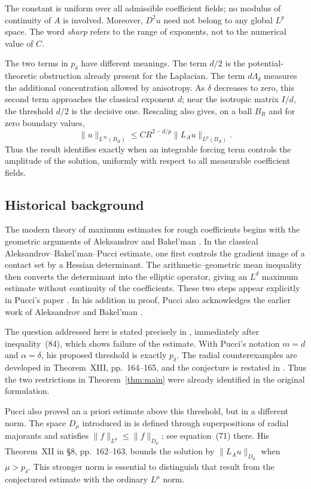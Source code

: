 \documentclass[11pt,a4paper,reqno]{amsart}
\theoremstyle{plain}
\theoremstyle{remark}
\numberwithin{equation}{section}
\newcommand{\lam}{\Lambda_\delta}
\newcommand{\pcrit}{p_\delta}
\newcommand{\norm}[1]{\lVert#1\rVert}
\begin{document}
The constant is uniform over all admissible coefficient fields; no modulus of continuity of $A$ is involved. Moreover, $D^2u$ need not belong to any global $L^p$ space. The word \emph{sharp} refers to the range of exponents, not to the numerical value of $C$.

The two terms in $\pcrit$ have different meanings. The term $d/2$ is the potential-theoretic obstruction already present for the Laplacian. The term $d\lam$ measures the additional concentration allowed by anisotropy. As $\delta$ decreases to zero, this second term approaches the classical exponent $d$; near the isotropic matrix $I/d$, the threshold $d/2$ is the decisive one. Rescaling also gives, on a ball $B_R$ and for zero boundary values,
\[
 \norm{u}_{L^\infty(B_R)}
 \le C R^{2-d/p}\norm{L_Au}_{L^p(B_R)}.
\]
Thus the result identifies exactly when an integrable forcing term controls the amplitude of the solution, uniformly with respect to all measurable coefficient fields.

\subsection{Historical background}
The modern theory of maximum estimates for rough coefficients begins with the geometric arguments of Aleksandrov and Bakel'man \cite{Aleksandrov1960,Bakelman1961}. In the classical Aleksandrov--Bakel'man--Pucci estimate, one first controls the gradient image of a contact set by a Hessian determinant. The arithmetic--geometric mean inequality then converts the determinant into the elliptic operator, giving an $L^d$ maximum estimate without continuity of the coefficients. These two steps appear explicitly in Pucci's paper \cite[\S1, Propositions~V--VI, pp.~18--19; \S2, Lemma and Theorem~I, pp.~20--21]{PucciBounds1966}. In his addition in proof, Pucci also acknowledges the earlier work of Aleksandrov and Bakel'man \cite[p.~30]{PucciBounds1966}.

The question addressed here is stated precisely in \cite[\S9, Observation~II, p.~166]{PucciExtremal1966}, immediately after inequality~(84), which shows failure of the estimate. With Pucci's notation $m=d$ and $\alpha=\delta$, his proposed threshold is exactly $\pcrit$. The radial counterexamples are developed in Theorem~XIII, pp.~164--165, and the conjecture is restated in \cite[\S4(a), p.~27]{PucciBounds1966}. Thus the two restrictions in Theorem~\ref{thm:main} were already identified in the original formulation.

Pucci also proved an a priori estimate above this threshold, but in a different norm. The space $D_\mu$ introduced in \cite[\S7, pp.~160--161]{PucciExtremal1966} is defined through superpositions of radial majorants and satisfies $\norm f_{L^\mu}\le\norm f_{D_\mu}$; see equation~(71) there. His Theorem~XII in \S8, pp.~162--163, bounds the solution by $\norm{L_Au}_{D_\mu}$ when $\mu>\pcrit$. This stronger norm is essential to distinguish that result from the conjectured estimate with the ordinary $L^\mu$ norm.
\end{document}
